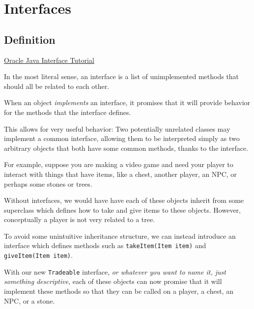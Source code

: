 \documentclass{article}
\begin{document}
    \newpage

    \section{Interfaces}
    	\subsection{Definition}
    		\href{https://docs.oracle.com/javase/tutorial/java/concepts/interface.html}{Oracle Java Interface Tutorial}

    		In the most literal sense, an interface is a list of unimplemented methods that should all be related to each other.

    		When an object \textit{implements} an interface, it promises that it will provide behavior for the methods that the interface defines.

    		This allows for very useful behavior: Two potentially unrelated classes may implement a common interface, allowing them to be interpreted simply as two arbitrary objects that both have some common methods, thanks to the interface.

    		For example, suppose you are making a video game and need your player to interact with things that have items, like a chest, another player, an NPC, or perhaps some stones or trees. 

    		Without interfaces, we would have have each of these objects inherit from some superclass which defines how to take and give items to these objects. However, conceptually a player is not very related to a tree. 

    		To avoid some unintuitive inheritance structure, we can instead introduce an interface which defines methods such as \verb|takeItem(Item item)| and \verb|giveItem(Item item)|.

    		With our new \verb|Tradeable| interface, \textit{or whatever you want to name it, just something descriptive}, each of these objects can now promise that it will implement these methods so that they can be called on a player, a chest, an NPC, or a stone.
\end{document}
